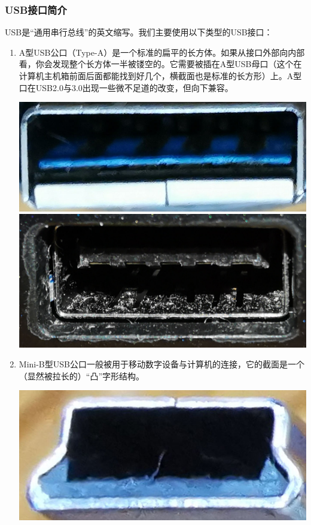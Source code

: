\subsubsection{USB接口简介}
USB是“通用串行总线”的英文缩写。我们主要使用以下类型的USB接口：
\begin{enumerate}
\item A型USB公口（Type-A）是一个标准的扁平的长方体。如果从接口外部向内部看，你会发现整个长方体一半被镂空的。它需要被插在A型USB母口（这个在计算机主机箱前面后面都能找到好几个，横截面也是标准的长方形）上。A型口在USB2.0与3.0出现一些微不足道的改变，但向下兼容。
\begin{center}
	\includegraphics[scale=0.15]{pic/A-USB-1}\includegraphics[scale=0.05]{pic/A-USB-2}
\end{center}
\item Mini-B型USB公口一般被用于移动数字设备与计算机的连接，它的截面是一个（显然被拉长的）“凸”字形结构。
\begin{center}
	\includegraphics[scale=0.05]{pic/Mini-USB-B-1}

\end{center}
\end{enumerate}
